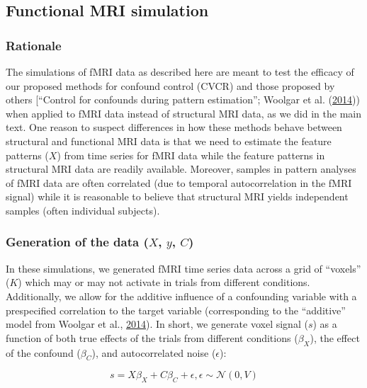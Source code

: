 \documentclass[11pt,american,a4paper,oneside,]{memoir} %
\begin{document}
\hypertarget{functional-mri-simulation}{%
\subsection{Functional MRI simulation}\label{functional-mri-simulation}}

\hypertarget{rationale}{%
\subsubsection{Rationale}\label{rationale}}

The simulations of fMRI data as described here are meant to test the efficacy of our proposed methods for confound control (CVCR) and those proposed by others {[}``Control for confounds during pattern estimation''; Woolgar et al. (\protect\hyperlink{ref-Woolgar2014-jb}{2014})) when applied to fMRI data instead of structural MRI data, as we did in the main text. One reason to suspect differences in how these methods behave between structural and functional MRI data is that we need to estimate the feature patterns (\(X\)) from time series for fMRI data while the feature patterns in structural MRI data are readily available. Moreover, samples in pattern analyses of fMRI data are often correlated (due to temporal autocorrelation in the fMRI signal) while it is reasonable to believe that structural MRI yields independent samples (often individual subjects).

\hypertarget{generation-of-the-data-x-y-c}{%
\subsubsection{\texorpdfstring{Generation of the data (\(X\), \(y\), \(C\))}{Generation of the data (X, y, C)}}\label{generation-of-the-data-x-y-c}}

In these simulations, we generated fMRI time series data across a grid of ``voxels'' (\(K\)) which may or may not activate in trials from different conditions. Additionally, we allow for the additive influence of a confounding variable with a prespecified correlation to the target variable (corresponding to the ``additive'' model from Woolgar et al., \protect\hyperlink{ref-Woolgar2014-jb}{2014}). In short, we generate voxel signal (\(s\)) as a function of both true effects of the trials from different conditions (\(\beta_{X}\)), the effect of the confound (\(\beta_{C}\)), and autocorrelated noise (\(\epsilon\)):

\begin{equation}
s = X\beta_{X} + C\beta_{C} + \epsilon, \epsilon \sim \mathcal{N}(0, V)
\end{equation}
\end{document}
